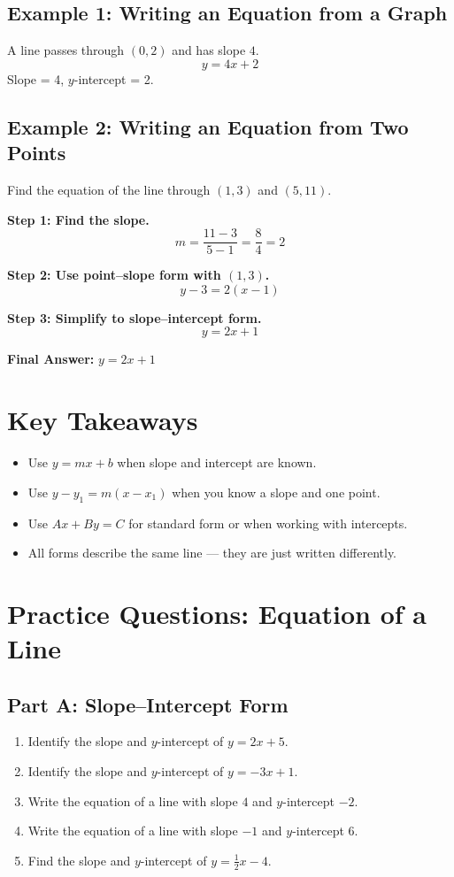 \documentclass[14pt]{extarticle}
\begin{document}
\subsection*{Example 1: Writing an Equation from a Graph}
A line passes through \((0, 2)\) and has slope \(4\).  
\[
y = 4x + 2
\]
Slope = 4, \(y\)-intercept = 2.

\subsection*{Example 2: Writing an Equation from Two Points}
Find the equation of the line through \((1, 3)\) and \((5, 11)\).

\textbf{Step 1: Find the slope.}
\[
m = \frac{11 - 3}{5 - 1} = \frac{8}{4} = 2
\]

\textbf{Step 2: Use point–slope form with \((1, 3)\).}
\[
y - 3 = 2(x - 1)
\]

\textbf{Step 3: Simplify to slope–intercept form.}
\[
y = 2x + 1
\]

\textbf{Final Answer:} \(\boxed{y = 2x + 1}\)

\section*{Key Takeaways}
\begin{itemize}
    \item Use \(y = mx + b\) when slope and intercept are known.
    \item Use \(y - y_1 = m(x - x_1)\) when you know a slope and one point.
    \item Use \(Ax + By = C\) for standard form or when working with intercepts.
    \item All forms describe the same line — they are just written differently.
\end{itemize}

\newpage


\section*{Practice Questions: Equation of a Line}

\subsection*{Part A: Slope–Intercept Form}
\begin{enumerate}
    \item Identify the slope and \(y\)-intercept of \(y = 2x + 5\).
    \item Identify the slope and \(y\)-intercept of \(y = -3x + 1\).
    \item Write the equation of a line with slope \(4\) and \(y\)-intercept \(-2\).
    \item Write the equation of a line with slope \(-1\) and \(y\)-intercept \(6\).
    \item Find the slope and \(y\)-intercept of \(y = \tfrac{1}{2}x - 4\).
\end{enumerate}
\end{document}
